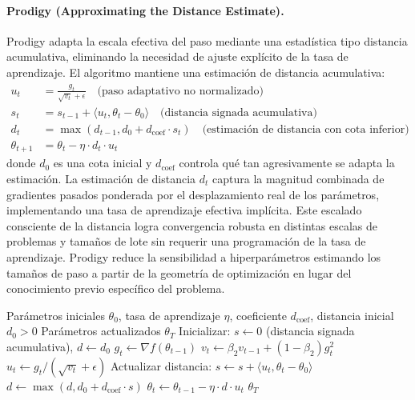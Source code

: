 \paragraph{Prodigy (Approximating the Distance Estimate).}
Prodigy adapta la escala efectiva del paso mediante una estadística tipo distancia acumulativa, eliminando la necesidad de ajuste explícito de la tasa de aprendizaje. El algoritmo mantiene una estimación de distancia acumulativa:
\begin{align}
u_t &= \frac{g_t}{\sqrt{v_t}+\epsilon} \quad\text{(paso adaptativo no normalizado)} \\
s_t &= s_{t-1} + \langle u_t, \theta_t - \theta_0 \rangle \quad\text{(distancia signada acumulativa)} \\
d_t &= \max(d_{t-1}, d_0 + d_{\text{coef}} \cdot s_t) \quad\text{(estimación de distancia con cota inferior)} \\
\theta_{t+1} &= \theta_t - \eta \cdot d_t \cdot u_t
\end{align}
donde $d_0$ es una cota inicial y $d_{\text{coef}}$ controla qué tan agresivamente se adapta la estimación. La estimación de distancia $d_t$ captura la magnitud combinada de gradientes pasados ponderada por el desplazamiento real de los parámetros, implementando una tasa de aprendizaje efectiva implícita. Este escalado consciente de la distancia logra convergencia robusta en distintas escalas de problemas y tamaños de lote sin requerir una programación de la tasa de aprendizaje. Prodigy reduce la sensibilidad a hiperparámetros estimando los tamaños de paso a partir de la geometría de optimización en lugar del conocimiento previo específico del problema.

\begin{algorithm}[H]
\caption{Prodigy (Approximating the Distance Estimate)}
\label{alg:prodigy}
\begin{algorithmic}[1]
\Require Parámetros iniciales $\theta_0$, tasa de aprendizaje $\eta$, coeficiente $d_{\text{coef}}$, distancia inicial $d_0 > 0$
\Ensure Parámetros actualizados $\theta_T$
\State Inicializar: $s \gets 0$ (distancia signada acumulativa), $d \gets d_0$
    \State $g_t \gets \nabla f(\theta_{t-1})$
    \State $v_t \gets \beta_2 v_{t-1} + (1-\beta_2) g_t^2$ 
    \State $u_t \gets g_t / (\sqrt{v_t} + \epsilon)$ 
    \State Actualizar distancia: $s \gets s + \langle u_t, \theta_t - \theta_0 \rangle$ 
    \State $d \gets \max(d, d_0 + d_{\text{coef}} \cdot s)$ 
    \State $\theta_t \gets \theta_{t-1} - \eta \cdot d \cdot u_t$ 
\EndFor
\Return $\theta_T$
\end{algorithmic}
\end{algorithm}

